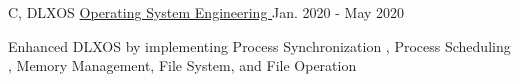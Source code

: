 

\begin{cventries}
  \cventry
    {C, DLXOS} %
    {\href{https://gitlab.com/lauchokyip/ece469}{Operating System Engineering \faExternalLink}} %
    {} %
    {Jan. 2020 - May 2020} %
    {
      \begin{cvitems} %
        \item {Enhanced DLXOS by implementing Process Synchronization , Process Scheduling , Memory Management, File System, and File Operation  }
      \end{cvitems}
    }





\end{cventries}

